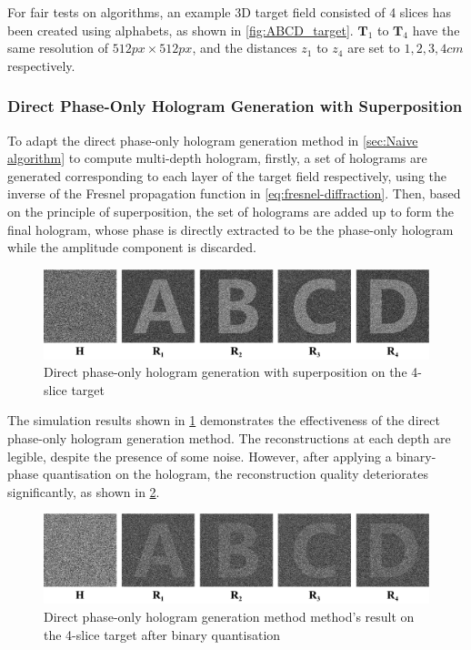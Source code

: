 For fair tests on algorithms, an example 3D target field consisted of 4 slices has been created using alphabets, as shown in \cref{fig:ABCD_target}. $\textbf{T}_1$ to $\textbf{T}_4$ have the same resolution of $512px \times 512px$, and the distances $z_1$ to $z_4$ are set to $1, 2, 3, 4 cm$ respectively.


\subsubsection{Direct Phase-Only Hologram Generation with Superposition}
To adapt the direct phase-only hologram generation method in \cref{sec:Naive algorithm} to compute multi-depth hologram, firstly, a set of holograms are generated corresponding to each layer of the target field respectively, using the inverse of the Fresnel propagation function in \cref{eq:fresnel-diffraction}. Then, based on the principle of superposition, the set of holograms are added up to form the final hologram, whose phase is directly extracted to be the phase-only hologram while the amplitude component is discarded.

\begin{figure}[H]
	\centering
	\includegraphics[width=1.0\textwidth]{ABCD/Naive_ABCD.pdf}
	\caption{Direct phase-only hologram generation with superposition on the 4-slice target}
	\label{fig:Naive_ABCD}
\end{figure}

The simulation results shown in \cref{fig:Naive_ABCD} demonstrates the effectiveness of the direct phase-only hologram generation method. The reconstructions at each depth are legible, despite the presence of some noise. However, after applying a binary-phase quantisation on the hologram, the reconstruction quality deteriorates significantly, as shown in \cref{fig:Naive_ABCD_binary}.

\begin{figure}[H]
	\centering
	\includegraphics[width=1.0\textwidth]{ABCD/Naive_ABCD_binary.pdf}
	\caption{Direct phase-only hologram generation method method's result on the 4-slice target after binary quantisation}
	\label{fig:Naive_ABCD_binary}
\end{figure}

